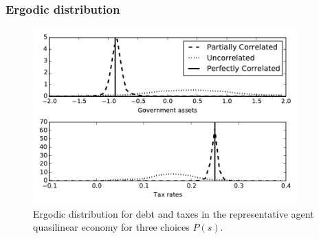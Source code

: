 \documentclass{beamer}
\begin{document}
\begin{frame}
\frametitle{Ergodic distribution} 
\begin{figure}[htp]
 \centering
 \includegraphics[width=4in]{plots/ErgodicQL.pdf}
 \caption{Ergodic distribution for debt and taxes in the representative agent quasilinear economy for three choices $P(s)$.}
 \label{fig: ergodic distribution ql}
 \end{figure}

\end{frame}
\end{document}
